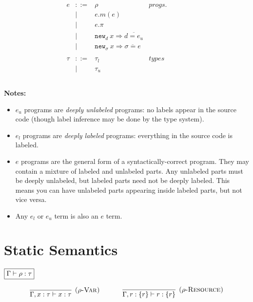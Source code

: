 \documentclass{llncs}
\newcommand{\keywadj}[1]{\mathtt{#1}}
\newcommand{\kwa}[1]{\keywadj{ #1 }}
\begin{document}
\[\begin{array}{lll}
\begin{array}{lllr}
	
	
	
	
	
	
	
	
e & ::= & \rho & progs. \\
	& | & e.m(e) \\
	& | & e.\pi \\
	& | & \kwa{new}_d~x \Rightarrow \overline{d = e_u} \\
	& | & \kwa{new}_\sigma~x \Rightarrow \overline{\sigma = e} \\
	&&\\
	
\tau & ::= & \tau_l & types \\
	& | & \tau_u \\
	&&\\
		
		
\end{array}
& ~~~~~~
&
\end{array}
\]

\noindent \textbf{Notes:}

\begin{itemize}
	\item $e_u$ programs are \textit{deeply unlabeled} programs: no labels appear in the source code (though label inference may be done by the type system).
	\item $e_l$ programs are \textit{deeply labeled} programs: everything in the source code is labeled.
	\item $e$ programs are the general form of a syntactically-correct program. They may contain a mixture of labeled and unlabeled parts. Any unlabeled parts must be deeply unlabeled, but labeled parts need not be deeply labeled. This means you can have unlabeled parts appearing inside labeled parts, but not vice versa.
	\item Any $e_l$ or $e_u$ term is also an $e$ term.
\end{itemize}


\section{Static Semantics}

\noindent
$\fbox{$\Gamma \vdash \rho : \tau$}$

\[
\begin{array}{c}

\infer[\textsc{($\rho$-Var)}]
	{\Gamma, x : \tau \vdash x : \tau}
	{}
~~~~~~~~~~
\infer[\textsc{($\rho$-Resource)}]
	{\Gamma, r : \{ r \} \vdash r : \{ r \}}
	{} \\[6ex]

\end{array}
\]
\end{document}
